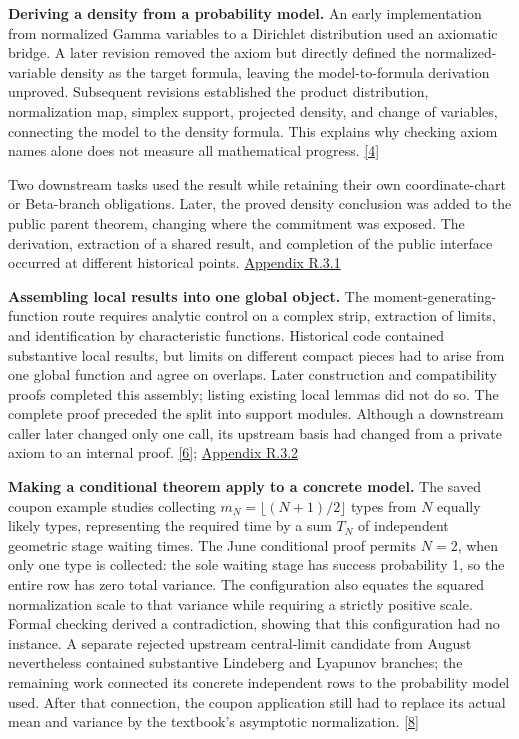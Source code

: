 \textbf{Deriving a density from a probability model.} An early implementation from normalized Gamma variables to a Dirichlet distribution used an axiomatic bridge. A later revision removed the axiom but directly defined the normalized-variable density as the target formula, leaving the model-to-formula derivation unproved. Subsequent revisions established the product distribution, normalization map, simplex support, projected density, and change of variables, connecting the model to the density formula. This explains why checking axiom names alone does not measure all mathematical progress. \hyperlink{ref-4}{\mbox{[4]}}

Two downstream tasks used the result while retaining their own coordinate-chart or Beta-branch obligations. Later, the proved density conclusion was added to the public parent theorem, changing where the commitment was exposed. The derivation, extraction of a shared result, and completion of the public interface occurred at different historical points. \href{en-appendix.pdf\#r3-1}{Appendix R.3.1}

\textbf{Assembling local results into one global object.} The moment-generating-function route requires analytic control on a complex strip, extraction of limits, and identification by characteristic functions. Historical code contained substantive local results, but limits on different compact pieces had to arise from one global function and agree on overlaps. Later construction and compatibility proofs completed this assembly; listing existing local lemmas did not do so. The complete proof preceded the split into support modules. Although a downstream caller later changed only one call, its upstream basis had changed from a private axiom to an internal proof. \hyperlink{ref-6}{\mbox{[6]}}; \href{en-appendix.pdf\#r3-2}{Appendix R.3.2}

\textbf{Making a conditional theorem apply to a concrete model.} The saved coupon example studies collecting $m_N=\lfloor(N+1)/2\rfloor$ types from $N$ equally likely types, representing the required time by a sum $T_N$ of independent geometric stage waiting times. The June conditional proof permits $N=2$, when only one type is collected: the sole waiting stage has success probability 1, so the entire row has zero total variance. The configuration also equates the squared normalization scale to that variance while requiring a strictly positive scale. Formal checking derived a contradiction, showing that this configuration had no instance. A separate rejected upstream central-limit candidate from August nevertheless contained substantive Lindeberg and Lyapunov branches; the remaining work connected its concrete independent rows to the probability model used. After that connection, the coupon application still had to replace its actual mean and variance by the textbook's asymptotic normalization. \hyperlink{ref-8}{\mbox{[8]}}

